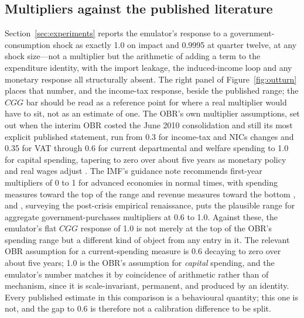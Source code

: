 \subsection{Multipliers against the published literature}
\label{sec:multlit}

Section~\ref{sec:experiments} reports the emulator's response to a government-consumption shock as exactly 1.0 on impact and 0.9995 at quarter twelve, at any shock size---not a multiplier but the arithmetic of adding a term to the expenditure identity, with the import leakage, the induced-income loop and any monetary response all structurally absent. The right panel of Figure~\ref{fig:outturn} places that number, and the income-tax response, beside the published range; the $CGG$ bar should be read as a reference point for where a real multiplier would have to sit, not as an estimate of one. The OBR's own multiplier assumptions, set out when the interim OBR costed the June 2010 consolidation and still its most explicit published statement, run from 0.3 for income-tax and NICs changes and 0.35 for VAT through 0.6 for current departmental and welfare spending to 1.0 for capital spending, tapering to zero over about five years as monetary policy and real wages adjust \citep{obr2010multipliers}. The IMF's guidance note recommends first-year multipliers of 0 to 1 for advanced economies in normal times, with spending measures toward the top of the range and revenue measures toward the bottom \citep{batini2014}, and \citet{ramey2019}, surveying the post-crisis empirical renaissance, puts the plausible range for aggregate government-purchases multipliers at 0.6 to 1.0. Against these, the emulator's flat $CGG$ response of 1.0 is not merely at the top of the OBR's spending range but a different kind of object from any entry in it. The relevant OBR assumption for a current-spending measure is 0.6 decaying to zero over about five years; 1.0 is the OBR's assumption for \emph{capital} spending, and the emulator's number matches it by coincidence of arithmetic rather than of mechanism, since it is scale-invariant, permanent, and produced by an identity. Every published estimate in this comparison is a behavioural quantity; this one is not, and the gap to 0.6 is therefore not a calibration difference to be split.

